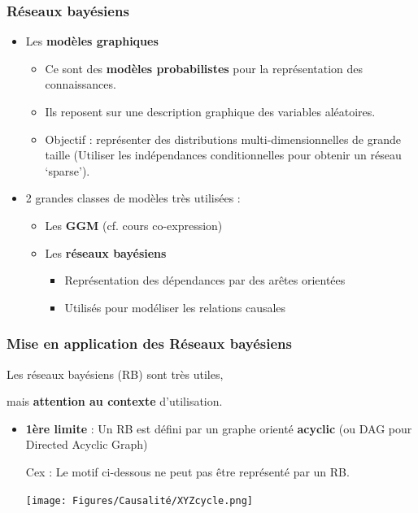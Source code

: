 	 
 \begin{frame}
   \frametitle{Réseaux bayésiens }
   
   \begin{itemize}
       \item Les \textbf{modèles graphiques}
       \begin{itemize}
            \item Ce sont des \textbf{modèles probabilistes} pour la représentation des connaissances. 
            \item Ils reposent sur une description graphique des variables aléatoires.
            \item Objectif : représenter des distributions multi-dimensionnelles de grande taille (Utiliser les indépendances conditionnelles pour obtenir un réseau ‘sparse'). %
       \end{itemize}
       
       \pause 
       
    \item 2 grandes classes de modèles très utilisées :
    \begin{itemize}
        \item Les \textbf{GGM} (cf. cours co-expression)
        \item Les \textbf{réseaux bayésiens}
        \begin{itemize}
            \item Représentation des dépendances par des arêtes orientées
            \item Utilisés pour modéliser les relations causales 
    \end{itemize}
    \end{itemize}
    
   \end{itemize}
   	\end{frame}




 \begin{frame}
   \frametitle{Mise en application des Réseaux bayésiens}
   
   Les réseaux bayésiens (RB) sont très utiles,\\
   \pause 
   
   \hspace{4cm} mais \textbf{attention au contexte} d'utilisation. 
   
  \pause
  
	 \begin{itemize}
 

\item \textbf{1ère limite} : Un RB est défini par un graphe orienté \textbf{acyclic} (ou DAG pour Directed Acyclic Graph)


Cex : Le motif ci-dessous ne peut pas être représenté par un RB.

    \begin{center}
    \texttt{[image: Figures/Causalité/XYZcycle.png]}        
    \end{center}
    

    
\end{itemize}

	 \end{frame}
	 
